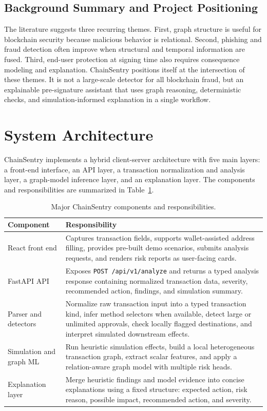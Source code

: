 \documentclass[11pt]{article}
\begin{document}
\subsection{Background Summary and Project Positioning}

The literature suggests three recurring themes. First, graph structure is useful for blockchain security because malicious behavior is relational. Second, phishing and fraud detection often improve when structural and temporal information are fused. Third, end-user protection at signing time also requires consequence modeling and explanation. ChainSentry positions itself at the intersection of these themes. It is not a large-scale detector for all blockchain fraud, but an explainable pre-signature assistant that uses graph reasoning, deterministic checks, and simulation-informed explanation in a single workflow.

\section{System Architecture}

ChainSentry implements a hybrid client-server architecture with five main layers: a front-end interface, an API layer, a transaction normalization and analysis layer, a graph-model inference layer, and an explanation layer. The components and responsibilities are summarized in Table~\ref{tab:architecture}.

\begin{table}[H]
\centering
\caption{Major ChainSentry components and responsibilities.}
\label{tab:architecture}
\begin{tabular}{p{3cm} p{10.5cm}}
\toprule
Component & Responsibility \\
\midrule
React front end & Captures transaction fields, supports wallet-assisted address filling, provides pre-built demo scenarios, submits analysis requests, and renders risk reports as user-facing cards. \\
FastAPI API & Exposes \texttt{POST /api/v1/analyze} and returns a typed analysis response containing normalized transaction data, severity, recommended action, findings, and simulation summary. \\
Parser and detectors & Normalize raw transaction input into a typed transaction kind, infer method selectors when available, detect large or unlimited approvals, check locally flagged destinations, and interpret simulated downstream effects. \\
Simulation and graph ML & Run heuristic simulation effects, build a local heterogeneous transaction graph, extract scalar features, and apply a relation-aware graph model with multiple risk heads. \\
Explanation layer & Merge heuristic findings and model evidence into concise explanations using a fixed structure: expected action, risk reason, possible impact, recommended action, and severity. \\
\bottomrule
\end{tabular}
\end{table}
\end{document}

